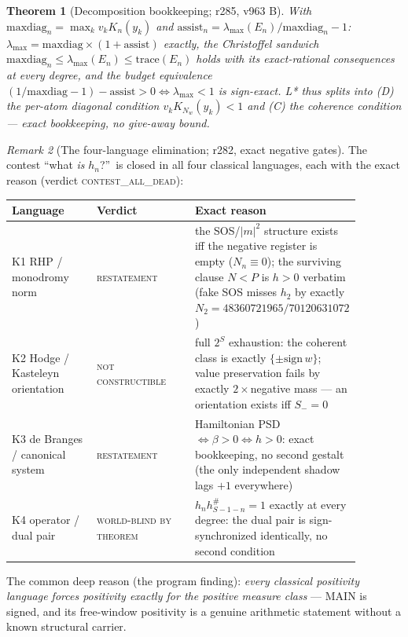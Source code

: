 \documentclass[11pt]{article}
\newtheorem{theorem}{Theorem}[section]
\theoremstyle{definition}
\theoremstyle{remark}
\newtheorem{remark}[theorem]{Remark}
\begin{document}
\begin{theorem}[Decomposition bookkeeping; r285, v963 B]
\label{thm:decomp}
With $\mathrm{maxdiag}_n=\max_k v_kK_n(y_k)$ and
$\mathrm{assist}_n=\lambda_{\max}(E_n)/\mathrm{maxdiag}_n-1$:
$\lambda_{\max}=\mathrm{maxdiag}\times(1+\mathrm{assist})$ exactly,
the Christoffel sandwich $\mathrm{maxdiag}_n\le\lambda_{\max}(E_n)\le
\mathrm{trace}(E_n)$ holds with its exact-rational consequences at
every degree, and the budget equivalence
$(1/\mathrm{maxdiag}-1)-\mathrm{assist}>0\iff\lambda_{\max}<1$ is
sign-exact.  L* thus splits into (D) the per-atom diagonal condition
$v_kK_{N_w}(y_k)<1$ and (C) the coherence condition --- exact
bookkeeping, no give-away bound.
\end{theorem}

\begin{remark}[The four-language elimination; r282, exact negative
gates]\label{rem:contest}
The contest ``what \emph{is} $h_n$?''\ is closed in all four classical
languages, each with the exact reason (verdict
\textsc{contest\_all\_dead}):
\begin{center}\small
\begin{tabular}{@{}p{0.26\linewidth}p{0.30\linewidth}p{0.32\linewidth}@{}}
\toprule
\textbf{Language} & \textbf{Verdict} & \textbf{Exact reason}\\
\midrule
K1 RHP / monodromy norm & \textsc{restatement} &
the SOS/$|m|^2$ structure exists iff the negative register is empty
($N_n\equiv0$); the surviving clause $N<P$ is $h>0$ verbatim (fake SOS
misses $h_2$ by exactly $N_2=48360721965/70120631072$)\\
\addlinespace
K2 Hodge / Kasteleyn orientation & \textsc{not constructible} &
full $2^S$ exhaustion: the coherent class is exactly
$\{\pm\mathrm{sign}\,w\}$; value preservation fails by exactly
$2\times$negative mass --- an orientation exists iff $S_-=0$\\
\addlinespace
K3 de Branges / canonical system & \textsc{restatement} &
Hamiltonian PSD $\iff\beta>0\iff h>0$: exact bookkeeping, no second
gestalt (the only independent shadow lags $+1$ everywhere)\\
\addlinespace
K4 operator / dual pair & \textsc{world-blind by theorem} &
$h_nh^{\#}_{S-1-n}=1$ exactly at every degree: the dual pair is
sign-synchronized identically, no second condition\\
\bottomrule
\end{tabular}
\end{center}
The common deep reason (the program finding): \emph{every classical
positivity language forces positivity exactly for the positive measure
class} --- MAIN is signed, and its free-window positivity is a genuine
arithmetic statement without a known structural carrier.
\end{remark}
\end{document}
